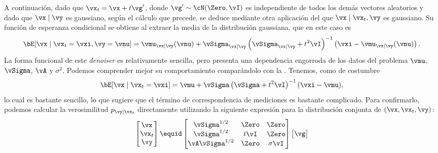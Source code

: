 \documentclass[../../book-main_es.tex]{subfiles}
\begin{document}
\begin{example}
    A continuación, dado que $\vx_t = \vx + t \vg'$, donde $\vg' \sim \cN(\Zero, \vI)$ es
    independiente de todos los demás vectores aleatorios y dado que $\vx \mid \vy$
    es gaussiano,
    según el cálculo que precede, se deduce mediante otra
    aplicación del  que $\vx
    \mid \vx_t, \vy$
    es gaussiano. Su función de esperanza condicional se obtiene al extraer la 
    media de la distribución gaussiana, que en este caso es
    \begin{equation}\label{eq:conditional-posterior-denoiser-gaussian-case}
        \bE[ \vx \mid \vx_t=\vxi, \vy=\vnu ]
        =
        \vmu_{\vx\mid \vy}(\vnu) + \vSigma_{\vx\mid\vy}\left(
            \vSigma_{\vx\mid \vy} + t^2 \vI
        \right)^{-1}\left(
            \vxi - \vmu_{\vx\mid \vy}(\vnu)
        \right).
    \end{equation}
    La forma funcional de este \textit{denoiser} es relativamente sencilla, pero presenta una
    dependencia engorroda de los datos del problema $\vmu$, $\vSigma$, $\vA$ y
    $\sigma^2$.
    Podemos comprender mejor su comportamiento comparándolo con la
    .
    Tenemos, como de costumbre
    \begin{equation}\label{eq:posterior-denoiser-gaussian-case}
        \bE[\vx \mid \vx_t=\vxi]
        = \vmu + \vSigma\left(\vSigma + t^2 \vI\right)^{-1} (\vxi - \vmu),
    \end{equation}
    lo cual es bastante sencillo, lo que sugiere que el término de correspondencia de mediciones es
    bastante complicado. Para confirmarlo, podemos calcular la verosimilitud $p_{\vy
    \mid \vx_t}$ directamente utilizando la siguiente expresión para la distribución conjunta
    de $(\vx, \vx_t, \vy)$:
    \begin{equation}
        \begin{bmatrix}
            \vx \\
            \vx_t \\
            \vy
        \end{bmatrix}
        \equid
        \begin{bmatrix}
            \vSigma^{1/2} & \Zero & \Zero \\
            \vSigma^{1/2} & t\vI & \Zero \\
            \vA \vSigma^{1/2} & \Zero & \sigma \vI
        \end{bmatrix}
        \begin{bmatrix}
            \vg \\

\end{bmatrix}
\end{equation}
\end{example}
\end{document}
